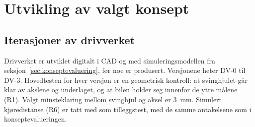 \section{Utvikling av valgt konsept}
\label{sec:utvikling}

\subsection{Iterasjoner av drivverket}
\label{sec:dv-serien}
Drivverket er utviklet digitalt i CAD og med simuleringsmodellen fra seksjon~\ref{sec:konseptevaluering}, før noe er produsert. Versjonene heter DV-0 til DV-3. Hovedtesten for hver versjon er en geometrisk kontroll: at svinghjulet går klar av akslene og underlaget, og at bilen holder seg innenfor de ytre målene (R1). Valgt minsteklaring mellom svinghjul og aksel er \SI{3}{mm}. Simulert kjøredistanse (R6) er tatt med som tilleggstest, med de samme antakelsene som i konseptevalueringen.

